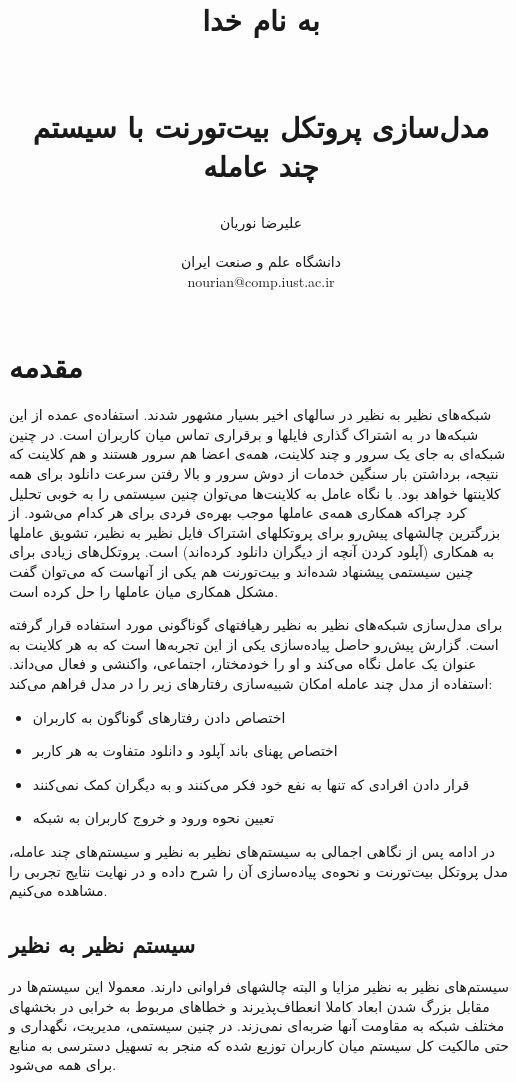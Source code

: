 \documentclass{report}
\title{
\begin{normalsize} به نام خدا \end{normalsize}
\\[2cm]
 مدل‌سازی پروتکل بیت‌تورنت با سیستم چند عامله
}
\author{علیرضا نوریان
\\
\\ \small دانشگاه علم و صنعت ایران
\\ \small nourian@comp.iust.ac.ir
}
\begin{document}
\maketitle

\section{مقدمه}
شبکه‌های نظیر به نظیر در سالهای اخیر بسیار مشهور شدند. استفاده‌ی عمده از این شبکه‌ها در به اشتراک گذاری فایلها و برقراری تماس میان کاربران است. در چنین شبکه‌ای به جای یک سرور و چند کلاینت، همه‌ی اعضا هم سرور هستند و هم کلاینت که نتیجه، برداشتن بار سنگین خدمات از دوش سرور و بالا رفتن سرعت دانلود برای همه کلاینتها خواهد بود. با نگاه عامل به کلاینت‌ها می‌توان چنین سیستمی را به خوبی تحلیل کرد چراکه همکاری  همه‌ی عاملها موجب بهره‌ی فردی برای هر کدام می‌شود. از بزرگترین چالشهای پیش‌رو برای پروتکلهای اشتراک فایل نظیر به نظیر، تشویق عاملها به همکاری (آپلود کردن آنچه از دیگران دانلود کرده‌اند) است. پروتکل‌های زیادی برای چنین سیستمی پیشنهاد شده‌اند و بیت‌تورنت هم یکی از آنهاست که می‌توان گفت مشکل همکاری میان عاملها را حل کرده است.

برای مدل‌سازی شبکه‌های نظیر به نظیر رهیافتهای گوناگونی مورد استفاده قرار گرفته است. گزارش پیش‌رو حاصل پیاده‌سازی یکی از این تجربه‌ها\cite{mas-torrent} است که به هر کلاینت به عنوان یک عامل نگاه می‌کند و او را خودمختار، اجتماعی، واکنشی و فعال می‌داند. استفاده از مدل چند عامله امکان شبیه‌سازی رفتارهای زیر را در مدل فراهم می‌کند:
\begin{itemize}
\item
اختصاص دادن رفتارهای گوناگون به کاربران
\item
اختصاص پهنای باند آپلود و دانلود متفاوت به هر کاربر
\item
قرار دادن افرادی که تنها به نفع خود فکر می‌کنند و به دیگران کمک نمی‌کنند
\item
تعیین نحوه ورود و خروج کاربران به شبکه
\end{itemize}

در ادامه پس از نگاهی اجمالی به سیستم‌های نظیر به نظیر و سیستم‌های چند عامله، مدل پروتکل بیت‌تورنت و نحوه‌ی پیاده‌سازی آن را شرح داده و در نهایت نتایج تجربی را مشاهده می‌کنیم. 

\subsection{سیستم نظیر به نظیر}
سیستم‌های نظیر به نظیر مزایا و البته چالشهای فراوانی دارند. معمولا این سیستم‌ها در مقابل بزرگ شدن ابعاد کاملا انعطاف‌پذیرند و خطاهای مربوط به خرابی در بخشهای مختلف شبکه به مقاومت آنها ضربه‌ای نمی‌زند. در چنین سیستمی، مدیریت، نگهداری و حتی مالکیت کل سیستم میان کاربران توزیع شده که منجر به تسهیل دسترسی به منابع برای همه می‌شود.
\end{document}
